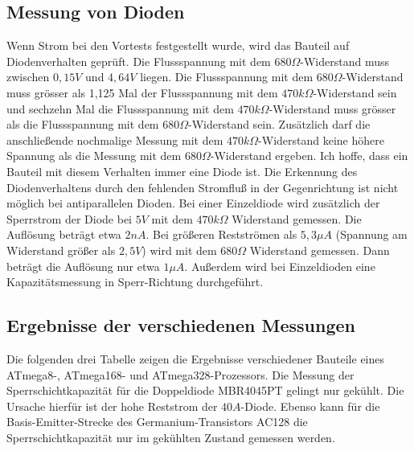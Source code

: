 \subsection{Messung von Dioden}
\label{sec:diode}
Wenn Strom bei den Vortests festgestellt wurde, wird das Bauteil auf Diodenverhalten geprüft.
Die Flussspannung mit dem \(680\Omega\)-Widerstand muss zwischen \(0,15V\) und \(4,64V\) liegen.
Die Flussspannung mit dem \(680\Omega\)-Widerstand muss grösser als 1,125 Mal der Flussspannung mit dem
 \(470k\Omega\)-Widerstand sein und sechzehn Mal die Flussspannung mit dem \(470k\Omega\)-Widerstand muss
grösser als die Flussspannung mit dem \(680\Omega\)-Widerstand sein.
Zusätzlich darf die anschließende nochmalige Messung mit dem \(470k\Omega\)-Widerstand keine höhere Spannung als die
Messung mit dem \(680\Omega\)-Widerstand ergeben.
Ich hoffe, dass ein Bauteil mit diesem Verhalten immer eine Diode ist.
Die Erkennung des Diodenverhaltens durch den fehlenden Stromfluß in der Gegenrichtung ist nicht
möglich bei antiparallelen Dioden.
Bei einer Einzeldiode wird zusätzlich der Sperrstrom der Diode bei \(5V\) mit dem \(470k\Omega\) Widerstand
gemessen. Die Auflösung beträgt etwa \(2nA\).
Bei größeren Restströmen als \(5,3\mu A\) (Spannung am Widerstand größer als \(2,5V\)) wird
 mit dem \(680\Omega\) Widerstand gemessen.
Dann beträgt die Auflösung nur etwa \(1\mu A\).
Außerdem wird bei Einzeldioden eine Kapazitätsmessung in Sperr-Richtung durchgeführt. 

\subsection{Ergebnisse der verschiedenen Messungen}
Die folgenden drei Tabelle zeigen die Ergebnisse verschiedener Bauteile 
eines ATmega8-, ATmega168- und ATmega328-Prozessors.
Die Messung der Sperrschichtkapazität für die Doppeldiode MBR4045PT gelingt
nur gekühlt. Die Ursache hierfür ist der hohe Reststrom der \(40A\)-Diode. Ebenso kann für die Basis-Emitter-Strecke 
des Germanium-Transistors AC128 die Sperrschichtkapazität nur im
gekühlten Zustand gemessen werden. 

